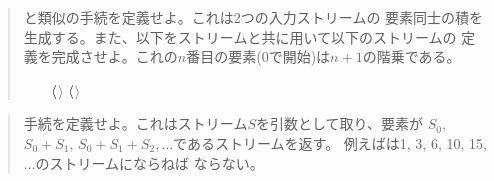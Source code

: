 \begin{quote}
と類似の手続を定義せよ。これは2つの入力ストリームの
要素同士の積を生成する。また、以下をストリームと共に用いて以下のストリームの
定義を完成させよ。これの\( n \)番目の要素(0で開始)は\( n + 1 \)の階乗である。

~%
~%
\noindent
{}\( \kern0.7ex\langle \)\( \rangle \)\( \kern0.7ex\langle \)\( \rangle \)\code{)))}
\end{quote}

\begin{quote}
手続を定義せよ。これはストリーム\( S \)を引数として取り、要素が
\( S_0 \), \( S_0 + S_1 \), \( S_0 + S_1 + S_2, \dots \)であるストリームを返す。
例えばは1, 3, 6, 10, 15, \( \dots \)のストリームにならねば
ならない。
\end{quote}

